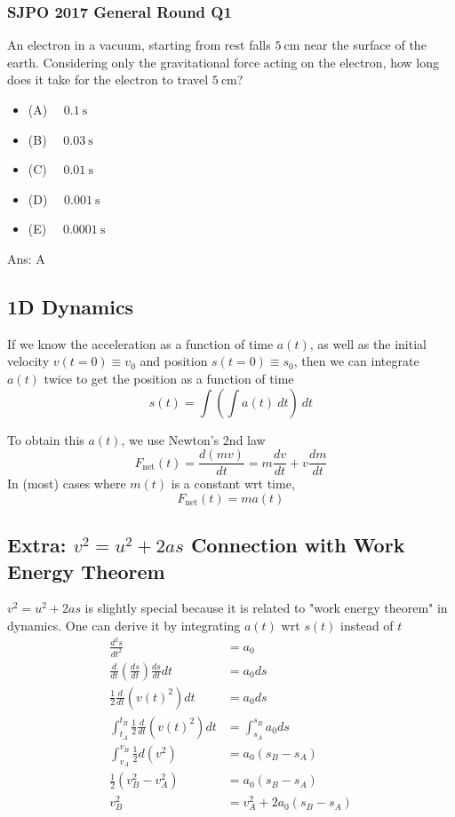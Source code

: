 \documentclass{article}
\begin{document}
\begin{samepage}
\subsubsection{SJPO 2017 General Round Q1} 
An electron in a vacuum, starting from rest falls $5 \mathrm{~cm}$ near the surface of the earth. Considering only the gravitational force acting on the electron, how long does it take for the electron to travel $5 \mathrm{~cm}$?
\begin{itemize}
\item[] (A) $\quad 0.1 \mathrm{~s}$
\item[] (B) $\quad 0.03 \mathrm{~s}$
\item[] (C) $\quad 0.01 \mathrm{~s}$
\item[] (D) $\quad 0.001 \mathrm{~s}$
\item[] (E) $\quad 0.0001 \mathrm{~s}$
\end{itemize}
Ans: A
\end{samepage}

\subsection{1D Dynamics}
If we know the acceleration as a function of time $a(t)$, as well as the initial velocity $v(t=0) \equiv v_0$ and position $s(t=0) \equiv s_0$, then we can integrate $a(t)$ twice to get the position as a function of time 
$$s(t) = \int \left(\int a(t)\ dt\right)\ dt$$

To obtain this $a(t)$, we use Newton's 2nd law 
$$F_{\text{net}}(t) = \frac{d(mv)}{dt} = m \frac{dv}{dt} + v \frac{dm}{dt}$$
In (most) cases where $m(t)$ is a constant wrt time, 
$$F_{\text{net}}(t) = ma(t)$$



\subsection{Extra: $v^2 = u^2 + 2as$ Connection with Work Energy Theorem}
$v^2 = u^2 + 2as$ is slightly special because it is related to "work energy theorem" in dynamics. One can derive it by integrating $a(t)$ wrt $s(t)$ instead of $t$ 
\begin{align}
    \frac{d^2 s}{dt^2} &= a_0 \\
    \frac{d}{dt} \left(\frac{ds}{dt}\right) \frac{ds}{dt} dt &= a_0 ds \\
    \frac{1}{2} \frac{d}{dt} \left( v(t)^2 \right) dt &= a_0 ds \\
    \int_{t_A}^{t_B} \frac{1}{2} \frac{d}{dt} \left( v(t)^2 \right) dt &= \int_{s_A}^{s_B} a_0 ds \\
    \int_{v_A}^{v_B} \frac{1}{2} d\left( v^2 \right) &= a_0 (s_B - s_A) \\
    \frac{1}{2} (v_B^2 - v_A^2) &= a_0 (s_B - s_A) \\
    v_B^2 &= v_A^2 + 2a_0(s_B - s_A)
\end{align}
\end{document}
